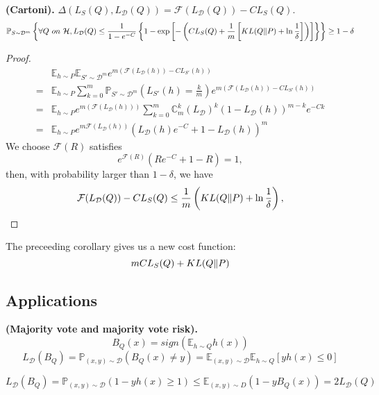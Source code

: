 \begin{corollary}
    \textbf{(Cartoni).}
    $ \Delta(L_{S}(Q), L_{\mathcal{D}}(Q)) = \mathcal{F}(L_{\mathcal{D}}(Q)) - C L_{S}(Q) $.
    \[
        \mathbb{P}_{S\sim\mathcal{D}^m}\left\{ \forall Q\ on\ \mathcal{H}, L_{\mathcal{D}}(Q) \le \frac{1}{1 - e^{-C}} \left\{ 1 - \exp \left[ - \left( C L_{S}(Q) + \frac{1}{m} \left[ KL(Q \Arrowvert P) + \ln \frac{1}{\delta}  \right] \right) \right] \right\} \right\} \ge 1 - \delta
    \]
    \begin{proof}
        \begin{align*}
            &\mathbb{E}_{h \sim P} \mathbb{E}_{S' \sim \mathcal{D}^m} e^{m(\mathcal{F}(L_{\mathcal{D}}(h)) - C L_{S'}(h))}\\
            =& \mathbb E_{h \sim P} \sum^{m}_{k=0} \mathbb{P}_{S' \sim \mathcal{D}^m}\left(L_{S'}(h) = \frac{k}{m} \right) e^{m(\mathcal{F}(L_{\mathcal{D}}(h)) - C L_{S'}(h))}\\
            =& \mathbb E_{h \sim P} e^{m(\mathcal{F}(L_{\mathcal{D}}(h)))}\sum^{m}_{k=0} \mathbb{C}^{k}_m {\left( L_{\mathcal{D}} \right)}^k {\left( 1 - L_{\mathcal{D}}(h)  \right)}^{m-k}e^{-Ck}\\
            =& \mathbb{E}_{h \sim P} e^{m \mathcal{F}(L_{\mathcal{D}}(h))} {\left( L_{\mathcal{D}}(h) e^{-C} + 1 - L_\mathcal{D}(h) \right)}^m
        \end{align*}
        We choose $ \mathcal{F}(R) $ satisfies
        \[
            e^{\mathcal{F}(R)}(R e^{-C} + 1 - R) = 1,
        \]
        then, with probability larger than $ 1 - \delta $, we have
        \[
            \mathcal{F}(L_{\mathcal{D}}(Q)) - C L_{S}(Q) \le \frac{1}{m} \left( KL(Q\Arrowvert P) + \ln \frac{1}{\delta}  \right),
        \]
    \end{proof}
\end{corollary}

The preceeding corollary gives us a new cost function:
\[
    mCL_{S}(Q) + KL(Q \Arrowvert P)
\]

\subsection{Applications}%

\begin{definition}
   \textbf{(Majority vote and majority vote risk).}
    \[
        B_{Q}(x) = sign\left( \mathbb{E}_{h \sim Q} h(x) \right)
    \]
    \[
        L_{\mathcal{D}} (B_Q) = \mathbb{P}_{(x, y) \sim \mathcal{D}} \left( B_{Q}(x) \ne y \right)
        = \mathbb{E}_{(x,y)\sim \mathcal{D}} \mathbb{E}_{h \sim Q} \left[ y h(x) \le 0 \right]
    \]
\end{definition}
\begin{corollary}
    \[
        L_{\mathcal{D}}(B_Q) = \mathbb{P}_{(x, y) \sim \mathcal{D}} ( 1 - y h(x) \ge 1)
        \le \mathbb{E}_{(x,y)\sim D}(1 - y B_Q(x)) = 2 L_{\mathcal{D}}(Q)
    \]
\end{corollary}

